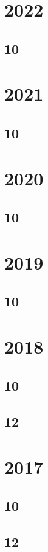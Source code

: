 \documentclass[11pt]{book}
\begin{document}
\section{2022}
\subsection{10}


\section{2021}
\subsection{10}

\section{2020}
\subsection{10}

\section{2019}
\subsection{10}

\section{2018}
\subsection{10}

\subsection{12}



\section{2017}
\subsection{10}

\subsection{12}

\end{document}
